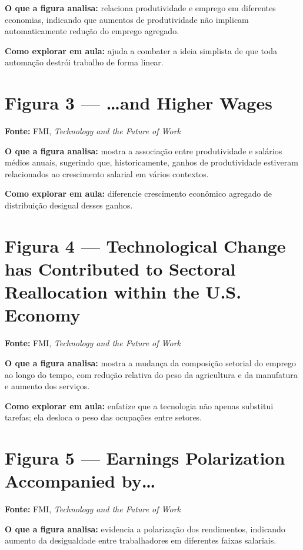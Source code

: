 \documentclass[
]{book}
\theoremstyle{definition}
\theoremstyle{definition}
\theoremstyle{definition}
\theoremstyle{definition}
\theoremstyle{remark}
\begin{document}
\textbf{O que a figura analisa:} relaciona produtividade e emprego em diferentes economias, indicando que aumentos de produtividade não implicam automaticamente redução do emprego agregado.

\textbf{Como explorar em aula:} ajuda a combater a ideia simplista de que toda automação destrói trabalho de forma linear.

\section{Figura 3 --- \ldots and Higher Wages}\label{figura-3-and-higher-wages}

\textbf{Fonte:} FMI, \emph{Technology and the Future of Work}

\textbf{O que a figura analisa:} mostra a associação entre produtividade e salários médios anuais, sugerindo que, historicamente, ganhos de produtividade estiveram relacionados ao crescimento salarial em vários contextos.

\textbf{Como explorar em aula:} diferencie crescimento econômico agregado de distribuição desigual desses ganhos.

\section{Figura 4 --- Technological Change has Contributed to Sectoral Reallocation within the U.S. Economy}\label{figura-4-technological-change-has-contributed-to-sectoral-reallocation-within-the-u.s.-economy}

\textbf{Fonte:} FMI, \emph{Technology and the Future of Work}

\textbf{O que a figura analisa:} mostra a mudança da composição setorial do emprego ao longo do tempo, com redução relativa do peso da agricultura e da manufatura e aumento dos serviços.

\textbf{Como explorar em aula:} enfatize que a tecnologia não apenas substitui tarefas; ela desloca o peso das ocupações entre setores.

\section{Figura 5 --- Earnings Polarization Accompanied by\ldots{}}\label{figura-5-earnings-polarization-accompanied-by}

\textbf{Fonte:} FMI, \emph{Technology and the Future of Work}

\textbf{O que a figura analisa:} evidencia a polarização dos rendimentos, indicando aumento da desigualdade entre trabalhadores em diferentes faixas salariais.
\end{document}
